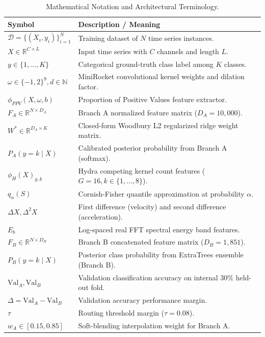 \begin{table}[t]
\centering
\caption{Mathematical Notation and Architectural Terminology.}
\label{tab:notation}
\small
\begin{tabular}{lp{6.2cm}}
\toprule
\textbf{Symbol} & \textbf{Description / Meaning} \\
\midrule
$\mathcal{D} = \{(X_i, y_i)\}_{i=1}^N$ & Training dataset of $N$ time series instances. \\
$X \in \mathbb{R}^{C \times L}$ & Input time series with $C$ channels and length $L$. \\
$y \in \{1, \dots, K\}$ & Categorical ground-truth class label among $K$ classes. \\
$\omega \in \{-1, 2\}^9, d \in \mathbb{N}$ & MiniRocket convolutional kernel weights and dilation factor. \\
$\phi_{PPV}(X, \omega, b)$ & Proportion of Positive Values feature extractor. \\
$F_A \in \mathbb{R}^{N \times D_A}$ & Branch A normalized feature matrix ($D_A = 10,000$). \\
$W^* \in \mathbb{R}^{D_A \times K}$ & Closed-form Woodbury L2 regularized ridge weight matrix. \\
$P_A(y = k \mid X)$ & Calibrated posterior probability from Branch A (softmax). \\
$\phi_H(X)_{g, k}$ & Hydra competing kernel count features ($G=16, k \in \{1,\dots,8\}$). \\
$q_\alpha(S)$ & Cornish-Fisher quantile approximation at probability $\alpha$. \\
$\Delta X, \Delta^2 X$ & First difference (velocity) and second difference (acceleration). \\
$E_b$ & Log-spaced real FFT spectral energy band features. \\
$F_B \in \mathbb{R}^{N \times D_B}$ & Branch B concatenated feature matrix ($D_B = 1,851$). \\
$P_B(y = k \mid X)$ & Posterior class probability from ExtraTrees ensemble (Branch B). \\
$\text{Val}_A, \text{Val}_B$ & Validation classification accuracy on internal 30\% held-out fold. \\
$\Delta = \text{Val}_A - \text{Val}_B$ & Validation accuracy performance margin. \\
$\tau$ & Routing threshold margin ($\tau = 0.08$). \\
$w_A \in [0.15, 0.85]$ & Soft-blending interpolation weight for Branch A. \\
\bottomrule
\end{tabular}
\end{table}
